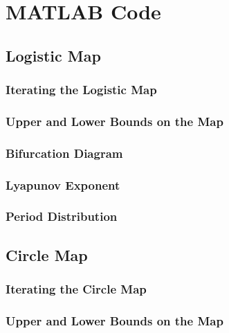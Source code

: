 \chapter{MATLAB Code}	\OnePageChapter         %
\section{Logistic Map}
\subsection{Iterating the Logistic Map}




\subsection{Upper and Lower Bounds on the Map}

\subsection{Bifurcation Diagram}



\subsection{Lyapunov Exponent}

\subsection{Period Distribution}



\section{Circle Map}
\subsection{Iterating the Circle Map}


\subsection{Upper and Lower Bounds on the Map}

